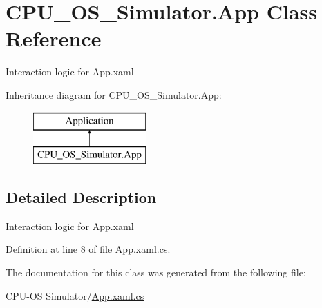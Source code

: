 \hypertarget{class_c_p_u___o_s___simulator_1_1_app}{}\section{C\+P\+U\+\_\+\+O\+S\+\_\+\+Simulator.\+App Class Reference}
\label{class_c_p_u___o_s___simulator_1_1_app}


Interaction logic for App.\+xaml  


Inheritance diagram for C\+P\+U\+\_\+\+O\+S\+\_\+\+Simulator.\+App\+:\begin{figure}[H]
\begin{center}
\leavevmode
\includegraphics[height=2.000000cm]{class_c_p_u___o_s___simulator_1_1_app}
\end{center}
\end{figure}


\subsection{Detailed Description}
Interaction logic for App.\+xaml 



Definition at line 8 of file App.\+xaml.\+cs.



The documentation for this class was generated from the following file\+:\begin{DoxyCompactItemize}
\item 
C\+P\+U-\/\+O\+S Simulator/\hyperlink{_c_p_u-_o_s_01_simulator_2_app_8xaml_8cs}{App.\+xaml.\+cs}\end{DoxyCompactItemize}
